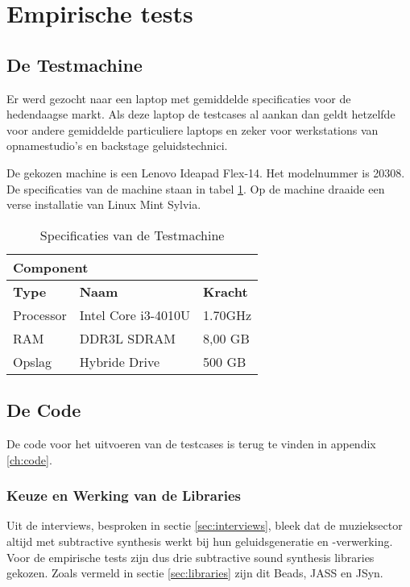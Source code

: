 \section{Empirische tests}
\label{sec:methodologie:empirischetests}

\subsection{De Testmachine}
\label{subsec:methodologie:testmachine}

Er werd gezocht naar een laptop met gemiddelde specificaties voor de hedendaagse markt. Als deze laptop de testcases al aankan dan geldt hetzelfde voor andere gemiddelde particuliere laptops en zeker voor werkstations van opnamestudio's en backstage geluidstechnici.

De gekozen machine is een Lenovo Ideapad Flex-14. Het modelnummer is 20308. De specificaties van de machine staan in tabel \ref{tab:specmachine}. Op de machine draaide een verse installatie van Linux Mint Sylvia.

\begin{table}[]
\begin{tabular}{lll}
\hline
\multicolumn{3}{l}{\textbf{Component}}                \\ \hline
\textbf{Type} & \textbf{Naam}       & \textbf{Kracht} \\ \hline
Processor     & Intel Core i3-4010U & 1.70GHz         \\ \hline
RAM           & DDR3L SDRAM         & 8,00 GB         \\ \hline
Opslag        & Hybride Drive       & 500 GB
\end{tabular}
\caption{Specificaties van de Testmachine}
\label{tab:specmachine}
\end{table}

\subsection{De Code}
\label{subsec:methodologie:code}

De code voor het uitvoeren van de testcases is terug te vinden in appendix \ref{ch:code}.

\subsubsection{Keuze en Werking van de Libraries}

Uit de interviews, besproken in sectie \ref{sec:interviews}, bleek dat de muzieksector altijd met subtractive synthesis werkt bij hun geluidsgeneratie en -verwerking. Voor de empirische tests zijn dus drie subtractive sound synthesis libraries gekozen. Zoals vermeld in sectie \ref{sec:libraries} zijn dit Beads, JASS en JSyn.

